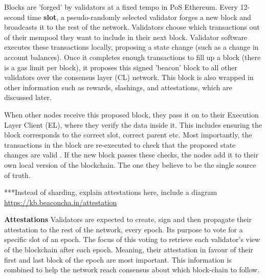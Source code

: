 Blocks are 'forged' by validators at a fixed tempo in PoS Ethereum. Every 12-second time \textbf{slot}, a pseudo-randomly selected validator forges a new block and broadcasts it to the rest of the network. Validators choose which transactions out of their mempool they want to include in their next block. Validator software executes these transactions locally, proposing a state change (such as a change in account balances). Once it completes enough transactions to fill up a block (there is a gas limit per block), it proposes this signed 'beacon' block to all other validators over the consensus layer (CL) network. This block is also wrapped in other information such as rewards, slashings, and attestations, which are discussed later.

When other nodes receive this proposed block, they pass it on to their Execution Layer Client (EL), where they verify the data inside it. This includes ensuring the block corresponds to the correct slot, correct parent etc. Most importantly, the transactions in the block are re-executed to check that the proposed state changes are valid \cite{EthereumEthereum.org}. If the new block passes these checks, the nodes add it to their own local version of the blockchain. The one they believe to be the single source of truth. 


***Instead of sharding, explain attestations here, include a diagram \url{https://kb.beaconcha.in/attestation}



\textbf{Attestations}
Validators are expected to create, sign and then propagate their attestation to the rest of the network, every epoch.
Its purpose to vote for a specific slot of an epoch. The focus of this voting to retrieve each validator's view of the blockchain after each epoch. Meaning, their attestation in favour of their first and last block of the epoch are most important. This information is combined to help the network reach consensus about which block-chain to follow.

